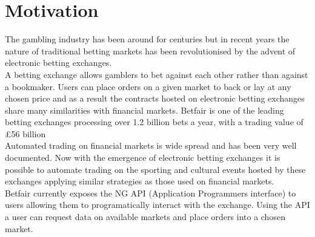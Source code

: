 \section{Motivation}
		The gambling industry has been around for centuries but in recent years the nature of traditional betting markets has been revolutionised by the advent of electronic betting exchanges.\\
		
		A betting exchange allows gamblers to bet against each other rather than against a bookmaker. Users can place orders on a given market to back or lay at any chosen price and as a result the contracts hosted on electronic betting exchanges share many similarities with financial markets. Betfair is one of the leading betting exchanges processing over 1.2 billion bets a year, with a trading value of \pounds 56 billion\cite{ABettingRevolution}\\
		
		Automated trading on financial markets is wide spread and has been very well documented\cite{TheFutureofComputerTradinginFinancialMarkets}. Now with the emergence of electronic betting exchanges it is possible to automate trading on the sporting and cultural events hosted by these exchanges applying similar strategies as those used on financial markets.\\
		
		Betfair currently exposes the NG API (Application Programmers interface) to users allowing them to programatically interact with the exchange. Using the API a user can request data on available markets and place orders into a chosen market.